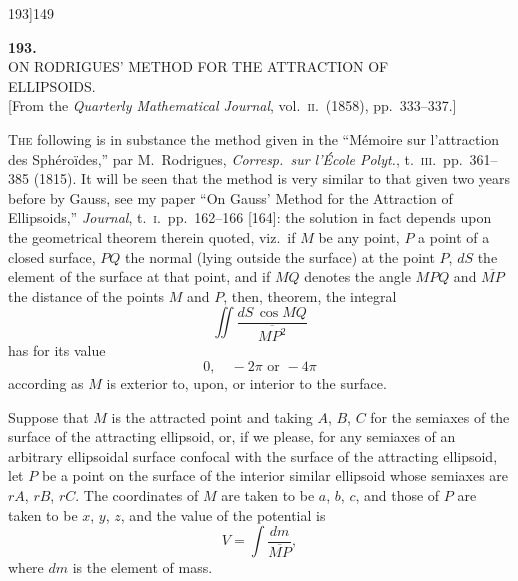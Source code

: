 \documentclass[11pt]{article}
\begin{document}
\medskip

\noindent [A different investigation of the formula $r^{2} = L\xi^{2} + M\eta^{2} + N\zeta^{2}$, by Dr Ferrers, was appended to the original Paper.]

\newpage

\begin{center}
\small 193]\hfill\textsc{}\hfill\textsc{149}
\end{center}

\bigskip

\begin{center}
{\Large\bfseries 193.}\\[8pt]
{\large ON RODRIGUES' METHOD FOR THE ATTRACTION OF\\
ELLIPSOIDS.}\\[6pt]
\small [From the \emph{Quarterly Mathematical Journal}, vol.~\textsc{ii}.\ (1858), pp.~333--337.]
\end{center}

\bigskip

\noindent \textsc{The} following is in substance the method given in the ``M\'emoire sur l'attraction des Sph\'ero\"ides,'' par M.~Rodrigues, \emph{Corresp.\ sur l'\'Ecole Polyt.}, t.~\textsc{iii}.\ pp.~361--385 (1815). It will be seen that the method is very similar to that given two years before by Gauss, see my paper ``On Gauss' Method for the Attraction of Ellipsoids,'' \emph{Journal}, t.~\textsc{i}.\ pp.~162--166 [164]: the solution in fact depends upon the geometrical theorem therein quoted, viz.\ if $M$ be any point, $P$ a point of a closed surface, $PQ$ the normal (lying outside the surface) at the point $P$, $dS$ the element of the surface at that point, and if $MQ$ denotes the angle $MPQ$ and $\overline{MP}$ the distance of the points $M$ and $P$, then, theorem, the integral
\[
\iint \frac{dS\,\cos MQ}{\overline{MP^{2}}}
\]
has for its value
\[
0,\quad -2\pi \text{ or } -4\pi
\]
according as $M$ is exterior to, upon, or interior to the surface.

Suppose that $M$ is the attracted point and taking $A$, $B$, $C$ for the semiaxes of the surface of the attracting ellipsoid, or, if we please, for any semiaxes of an arbitrary ellipsoidal surface confocal with the surface of the attracting ellipsoid, let $P$ be a point on the surface of the interior similar ellipsoid whose semiaxes are $r A$, $r B$, $r C$. The coordinates of $M$ are taken to be $a$, $b$, $c$, and those of $P$ are taken to be $x$, $y$, $z$, and the value of the potential is
\[
V = \int\frac{d m}{\overline{MP}},
\]
where $d m$ is the element of mass.
\end{document}
